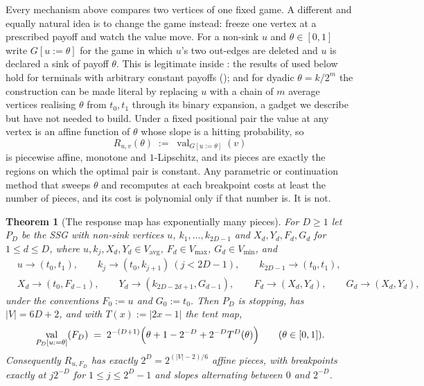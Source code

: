 \documentclass[11pt]{article}
\theoremstyle{plain}
\newtheorem{theorem}{Theorem}[section]
\theoremstyle{definition}
\DeclareMathOperator{\val}{val}
\newcommand{\Vmax}{V_{\max}}
\newcommand{\Vmin}{V_{\min}}
\newcommand{\Vavg}{V_{\mathrm{avg}}}
\begin{document}
Every mechanism above compares two vertices of one fixed game. A different and
equally natural idea is to change the game instead: freeze one vertex at a
prescribed payoff and watch the value move. For a non-sink $u$ and
$\theta\in[0,1]$ write $G[u{:=}\theta]$ for the game in which $u$'s two
out-edges are deleted and $u$ is declared a sink of payoff $\theta$. This is
legitimate inside : the results of
 used below hold for terminals with
arbitrary constant payoffs (); and for dyadic
$\theta=k/2^{m}$ the construction can be made literal by replacing $u$
with a chain of $m$ average vertices realising $\theta$ from $t_0,t_1$
through its binary expansion, a gadget we describe but have not needed to
build.
Under a fixed positional pair the value at any vertex is an affine function of
$\theta$ whose slope is a hitting probability, so
\[
  R_{u,v}(\theta)\;:=\;\val_{G[u:=\theta]}(v)
\]
is piecewise affine, monotone and $1$-Lipschitz, and its pieces are exactly the
regions on which the optimal pair is constant. Any parametric or continuation
method that sweeps $\theta$ and recomputes at each breakpoint costs at least the
number of pieces, and its cost is polynomial only if that number is. It is not.

\begin{theorem}[The response map has exponentially many pieces]\label{thm:fold}
For $D\ge1$ let $P_D$ be the SSG with non-sink vertices $u$,
$k_1,\dots,k_{2D-1}$ and $X_d,Y_d,F_d,G_d$ for $1\le d\le D$, where
$u,k_j,X_d,Y_d\in\Vavg$, $F_d\in\Vmax$, $G_d\in\Vmin$, and
\[
  \begin{aligned}
   &u\to(t_0,t_1),\qquad k_j\to(t_0,k_{j+1})\ (j<2D-1),\qquad k_{2D-1}\to(t_0,t_1),\\
   &X_d\to(t_0,F_{d-1}),\qquad Y_d\to(k_{2D-2d+1},G_{d-1}),\qquad
    F_d\to(X_d,Y_d),\qquad G_d\to(X_d,Y_d),
  \end{aligned}
\]
under the conventions $F_0:=u$ and $G_0:=t_0$. Then $P_D$ is stopping, has
$|V|=6D+2$, and with $T(x):=|2x-1|$ the tent map,
\[
  \val_{P_D[u:=\theta]}(F_D)\;=\;2^{-(D+1)}\Bigl(\theta+1-2^{-D}+2^{-D}T^{D}(\theta)\Bigr)
  \qquad(\theta\in[0,1]).
\]
Consequently $R_{u,F_D}$ has exactly $2^{D}=2^{(|V|-2)/6}$ affine pieces, with
breakpoints exactly at $j2^{-D}$ for $1\le j\le2^{D}-1$ and slopes alternating
between $0$ and $2^{-D}$.
\end{theorem}
\end{document}
